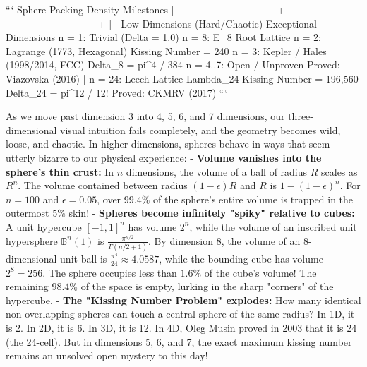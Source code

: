 \documentclass[11pt,twoside,openright]{amsbook}
\begin{document}
```
                      Sphere Packing Density Milestones
                                      |
         +----------------------------+----------------------------+
         |                                                         |
  Low Dimensions (Hard/Chaotic)                            Exceptional Dimensions
  n = 1: Trivial (Delta = 1.0)                             n = 8: E_8 Root Lattice
  n = 2: Lagrange (1773, Hexagonal)                               Kissing Number = 240
  n = 3: Kepler / Hales (1998/2014, FCC)                          Delta_8 = pi^4 / 384
  n = 4..7: Open / Unproven                                        Proved: Viazovska (2016)
                                                                   |
                                                           n = 24: Leech Lattice Lambda_24
                                                                   Kissing Number = 196,560
                                                                   Delta_24 = pi^12 / 12!
                                                                   Proved: CKMRV (2017)
```

As we move past dimension 3 into 4, 5, 6, and 7 dimensions, our three-dimensional visual intuition fails completely, and the geometry becomes wild, loose, and chaotic. In higher dimensions, spheres behave in ways that seem utterly bizarre to our physical experience:
- \textbf{Volume vanishes into the sphere's thin crust:} In $n$ dimensions, the volume of a ball of radius $R$ scales as $R^n$. The volume contained between radius $(1-\epsilon)R$ and $R$ is $1 - (1-\epsilon)^n$. For $n = 100$ and $\epsilon = 0.05$, over $99.4\%$ of the sphere's entire volume is trapped in the outermost $5\%$ skin!
- \textbf{Spheres become infinitely "spiky" relative to cubes:} A unit hypercube $[-1, 1]^n$ has volume $2^n$, while the volume of an inscribed unit hypersphere $\mathbb{B}^n(1)$ is $\frac{\pi^{n/2}}{\Gamma(n/2 + 1)}$. By dimension 8, the volume of an 8-dimensional unit ball is $\frac{\pi^4}{24} \approx 4.0587$, while the bounding cube has volume $2^8 = 256$. The sphere occupies less than $1.6\%$ of the cube's volume! The remaining $98.4\%$ of the space is empty, lurking in the sharp "corners" of the hypercube.
- \textbf{The "Kissing Number Problem" explodes:} How many identical non-overlapping spheres can touch a central sphere of the same radius? In 1D, it is 2. In 2D, it is 6. In 3D, it is 12. In 4D, Oleg Musin proved in 2003 that it is 24 (the 24-cell). But in dimensions 5, 6, and 7, the exact maximum kissing number remains an unsolved open mystery to this day!
\end{document}
